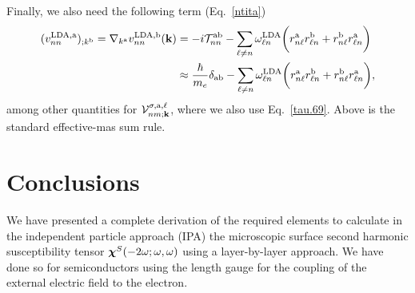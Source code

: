 \documentclass[floatfix,prb,aps,superscriptaddress,11pt,preprint,letterpaper]{revtex4}
\begin{document}
Finally,
we also need the following term (Eq.~\eqref{ntita})
\begin{align}\label{a.3c}
(v^{\mathrm{LDA},\mathrm{a}}_{nn})_{;k^{\mathrm{b}}}
=
\nabla_{k^{\mathrm{a}}}  
v^{\mathrm{LDA},\mathrm{b}}_{nn}(\mathbf{k})
&=
-i{\cal T}^{\mathrm{a}\mathrm{b}}_{nn}
-
\sum_{\ell\ne n}
\omega^{\mathrm{LDA}}_{\ell n}
\bigg(  
r^{\mathrm{a}}_{n\ell}  
r^{\mathrm{b}}_{\ell n}
+  
r^{\mathrm{b}}_{n\ell}  
r^{\mathrm{a}}_{\ell n}
\bigg)
\nonumber\\
&\approx
\frac{\hbar}{m_e}\delta_{\mathrm{a}\mathrm{b}}
-
\sum_{\ell\ne n}
\omega^{\mathrm{LDA}}_{\ell n}
\bigg(  
r^{\mathrm{a}}_{n\ell}  
r^{\mathrm{b}}_{\ell n}
+  
r^{\mathrm{b}}_{n\ell}  
r^{\mathrm{a}}_{\ell n}
\bigg)
,
\end{align}  
among other quantities for ${\mathbf{\cal V}}^{\sigma,\mathrm{a},\ell}_{nm;\mathbf{k}}$, where we 
also use Eq.~\eqref{tau.69}. Above is the standard effective-mas sum rule.
\cite{ashcroft_solid_1976} 


\section{Conclusions}\label{con}

We have presented a complete derivation of the required elements to
calculate in the independent particle approach (IPA) the microscopic  
surface second harmonic susceptibility tensor $\boldsymbol{\chi}^S(-2\omega;\omega,\omega)$ 
using a layer-by-layer approach. We have done so for semiconductors using 
the length gauge for the coupling of the external electric field to the 
electron. 

\appendix
%
%
%
%
%
%

%

\end{document}
